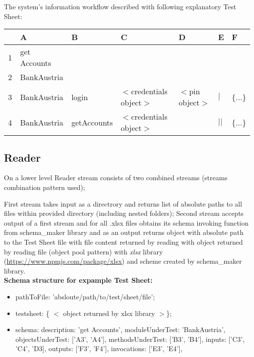 The system's information workflow described with following explanatory Test Sheet:\\
\begin{tabular}[h]{| c | l | l | l | l | l | l | }
	\hline
	 \  & A & B & C & D & E & F \\
		\hline
	1 & get Accounts & \ & \ & \ & \ & \ \\
		\hline
	2 & BankAustria & \ & \ & \ & \ & \  \\
		\hline
	3 & BankAustria & login & $<$credentials object$>$ & $<$pin object$>$ & $|$ & \{...\} \\
		\hline
	4 & BankAustria & getAccounts & $<$credentials object$>$ & \ & $||$ & \{...\} \\
	\hline
\end{tabular}

\subsection{Reader}


On a lower level Reader stream consists of two combined streams (streams combination pattern used);

First stream takes input as a directrory and returns list of absolute paths to all files within provided directory (including nested folders);
Second stream accepts output of a first stream and for all .xlsx files obtains its schema invoking function from schema\_maker library and as an output returns object with absolute path to the Test Sheet file with file content returned by reading with object returned by reading file (object pool pattern) with \textit{xlsx} library (\url{https://www.npmjs.com/package/xlsx}) and scheme created by schema\_maker library.\\
\textbf{Schema structure for expample Test Sheet:}
\begin{itemize}
	\item pathToFile: 'absloute/path/to/test/sheet/file';
	\item testsheet: \{ $<$ object returned by xlsx library $>$\};
	\item schema:
		\subitem description: 'get Accounts',
	    \subitem moduleUnderTest: 'BankAustria',
	    \subitem objectsUnderTest: ['A3', 'A4'],
	    \subitem methodsUnderTest: ['B3', 'B4'],
	    \subitem inputs: ['C3', 'C4', 'D3],
    	\subitem outputs: ['F3', 'F4'],
    	\subitem invocations: ['E3', 'E4'],
\end{itemize}

